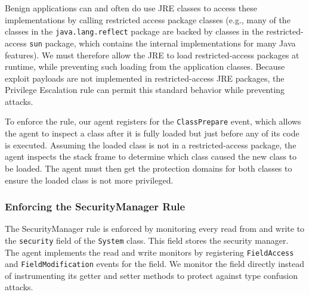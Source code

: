 \documentclass{sig-alternate}
\begin{document}

Benign applications can and often do use JRE classes to access these implementations by
calling restricted access package
classes (e.g., many of the classes in the \texttt{java.lang.reflect}
package are backed by classes in the restricted-access \texttt{sun} package, which
contains the internal implementations
for many Java features). We must therefore allow the JRE to load restricted-access packages
at runtime, while preventing such loading from the application classes.
Because exploit payloads are not implemented in restricted-access JRE packages,
the Privilege Escalation rule can permit this standard behavior while preventing
attacks. 

To enforce the rule, our agent registers for
the \texttt{ClassPrepare} event, which allows the agent to inspect
a class after it is fully loaded but just before any of its code is
executed. Assuming the loaded class is not in a restricted-access
package, the agent inspects the stack frame to determine which class
caused the new class to be loaded. The agent must then get the protection
domains for both classes to ensure the loaded class is not more privileged.

\subsubsection{Enforcing the SecurityManager Rule}\label{sub:Enforcing-the-SecurityManager}

The SecurityManager rule is enforced by monitoring every read from
and write to the \texttt{security} field of the \texttt{System} class.
This field stores the security manager.
The agent implements the read and write monitors by registering
\texttt{FieldAccess} and \texttt{FieldModification} events for the field. We 
monitor the field directly instead of instrumenting its getter and setter
methods to protect against type confusion attacks. 
\end{document}

